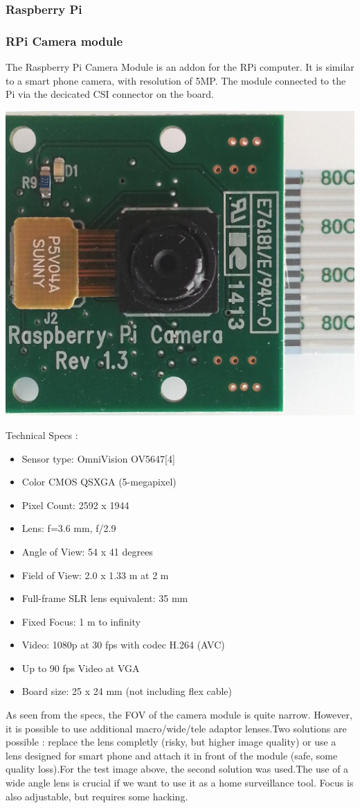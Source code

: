 \begin{multicols}{2}
	\subsubsection{Raspberry Pi}


		\subsubsection{RPi Camera module}

		The Raspberry Pi Camera Module is an addon for the RPi computer. It is similar to a smart phone camera, with resolution of 5MP. The module connected to the Pi via the decicated CSI connector on the board.

		
		\begin{center}
			
			\includegraphics[width=.2\textwidth]{gfx/RPiCam.jpg}
		\end{center}
		

		Technical Specs :
		\begin{itemize}
	    	\item Sensor type: OmniVision OV5647[4] 
	    	\item Color CMOS QSXGA (5-megapixel)
	    	\item Pixel Count: 2592 x 1944
	    	\item Lens: f=3.6 mm, f/2.9
	    	\item Angle of View: 54 x 41 degrees
	    	\item Field of View: 2.0 x 1.33 m at 2 m
	    	\item Full-frame SLR lens equivalent: 35 mm
	    	\item Fixed Focus: 1 m to infinity
	    	\item Video: 1080p at 30 fps with codec H.264 (AVC)
	    	\item Up to 90 fps Video at VGA
	    	\item Board size: 25 x 24 mm (not including flex cable)
    	\end{itemize}
 		As seen from the specs, the FOV of the camera module is quite narrow. However, it is possible to use additional macro/wide/tele adaptor lenses.Two solutions are possible : replace the lens completly (risky, but higher image quality) or use a lens designed for smart phone and attach it in front of the module (safe, some quality loss).For the test image above, the second solution was used.The use of a wide angle lens is crucial if we want to use it as a home surveillance tool. Focus is also adjustable, but requires some hacking. 

\end{multicols}
